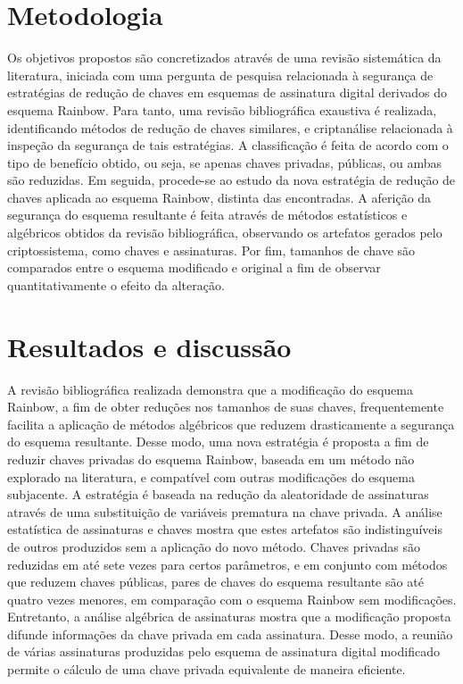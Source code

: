 \documentclass[english]{ufsc-thesis-rn46-2019/ufsc-thesis-rn46-2019}
\theoremstyle{definition}
\begin{document}
\begin{resumo}
  \section*{Metodologia}
  Os objetivos propostos são concretizados através de uma revisão sistemática
  da literatura, iniciada com uma pergunta de pesquisa relacionada à segurança
  de estratégias de redução de chaves em esquemas de assinatura digital
  derivados do esquema Rainbow. Para tanto, uma revisão bibliográfica exaustiva
  é realizada, identificando métodos de redução de chaves similares, e
  criptanálise relacionada à inspeção da segurança de tais estratégias. A
  classificação é feita de acordo com o tipo de benefício obtido, ou seja, se
  apenas chaves privadas, públicas, ou ambas são reduzidas. Em seguida,
  procede-se ao estudo da nova estratégia de redução de chaves aplicada ao
  esquema Rainbow, distinta das encontradas. A aferição da segurança do esquema
  resultante é feita através de métodos estatísticos e algébricos obtidos da
  revisão bibliográfica, observando os artefatos gerados pelo criptossistema,
  como chaves e assinaturas. Por fim, tamanhos de chave são comparados entre o
  esquema modificado e original a fim de observar quantitativamente o efeito da
  alteração.

  \section*{Resultados e discussão}
  A revisão bibliográfica realizada demonstra que a modificação do esquema
  Rainbow, a fim de obter reduções nos tamanhos de suas chaves, frequentemente
  facilita a aplicação de métodos algébricos que reduzem drasticamente a
  segurança do esquema resultante. Desse modo, uma nova estratégia é proposta a
  fim de reduzir chaves privadas do esquema Rainbow, baseada em um método não
  explorado na literatura, e compatível com outras modificações do esquema
  subjacente. A estratégia é baseada na redução da aleatoridade de assinaturas
  através de uma substituição de variáveis prematura na chave privada. A
  análise estatística de assinaturas e chaves mostra que estes artefatos são
  indistinguíveis de outros produzidos sem a aplicação do novo método. Chaves
  privadas são reduzidas em até sete vezes para certos parâmetros, e em
  conjunto com métodos que reduzem chaves públicas, pares de chaves do esquema
  resultante são até quatro vezes menores, em comparação com o esquema Rainbow
  sem modificações. Entretanto, a análise algébrica de assinaturas mostra que a
  modificação proposta difunde informações da chave privada em cada assinatura.
  Desse modo, a reunião de várias assinaturas produzidas pelo esquema de
  assinatura digital modificado permite o cálculo de uma chave privada
  equivalente de maneira eficiente.


\end{resumo}
\end{document}
